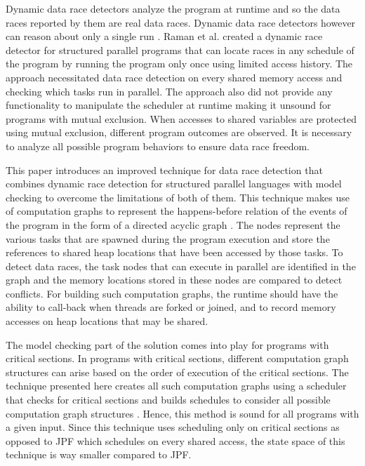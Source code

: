 Dynamic data race detectors analyze the program at runtime and so the data races reported by them are real data races. Dynamic data race detectors however can reason about only a single run \cite{flanagan2009fasttrack, savage1997eraser, mellor1991fly, schonberg1989fly, Feng97efficientdetection, Async-Finish-Race}. Raman et al. created a dynamic race detector for structured parallel programs that can locate races in any schedule of the program by running the program only once using limited access history\cite{raman2012scalable}. The approach necessitated data race detection on every shared memory access and checking which tasks run in parallel. The approach also did not provide any functionality to manipulate the scheduler at runtime making it unsound for programs with mutual exclusion. When accesses to shared variables are protected using mutual exclusion, different program outcomes are observed. It is necessary to analyze all possible program behaviors to ensure data race freedom.

This paper introduces an improved technique for data race detection that combines dynamic race detection for structured parallel languages with model checking to overcome the limitations of both of them. This technique makes use of computation graphs to represent the happens-before relation of the events of the program in the form of a directed acyclic graph \cite{dennis2012determinacy}. The nodes represent the various tasks that are spawned during the program execution and store the references to shared heap locations that have been accessed by those tasks. To detect data races, the task nodes that can execute in parallel are identified in the graph and the memory locations stored in these nodes are compared to detect conflicts. For building such computation graphs, the runtime should have the ability to call-back when threads are forked or joined, and to record memory accesses on heap locations that may be shared.

The model checking part of the solution comes into play for programs with critical sections. In programs with critical sections, different computation graph structures can arise based on the order of execution of the critical sections. The technique presented here creates all such computation graphs using a scheduler that checks for critical sections and builds schedules to consider all possible computation graph structures \cite{mercer2015model}. Hence, this method is sound for all programs with a given input. Since this technique uses scheduling only on critical sections as opposed to JPF which schedules on every shared access, the state space of this technique is way smaller compared to JPF.

